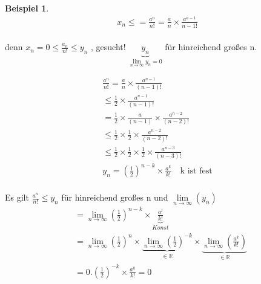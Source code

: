 \documentclass[a4paper,12pt,leqno]{report}
\theoremstyle{plain} %
\theoremstyle{definition} %
\newtheorem{example}[theorem]{Beispiel}
\begin{document}
\begin{example}
\begin{equation}
\begin{aligned}
x_n \leq  = \frac{a^n}{n!} = \frac{a}{n} \times \frac{a^{a-1}}{n-1!} %
\end{aligned}
\end{equation}\\

denn $ x_n = 0 \leq \frac{a_n}{n!} \leq y_n$ 
, gesucht! $\underbrace{y_n}_{\lim\limits_{n \rightarrow \infty}{y_n}=0}$  für hinreichend großes n. 

\begin{equation}
\begin{aligned}
\frac{a^n}{n!} = \frac{a}{n} \times \frac{a^{n-1}}{(n-1)!} \\ \leq 
\frac{1}{2} \times
\frac{a^{n-1}}{(n-1)!} \\ =
 \frac{1}{2} \times 
\frac{a}{(n-1)} \times 
\frac{a^{n-2}}{(n-2)!} \\ \leq
\frac{1}{2} \times 
\frac{1}{2} \times
\frac{a^{n-2}}{(n-2)!} \\ \leq
\frac{1}{2} \times
\frac{1}{2} \times
\frac{1}{2} \times 
\frac{a^{n-3}}{(n-3)!}\\
%
y_n = (\frac{1}{2})^{n-k} \times \frac{a^k}{k!} \quad \text{k ist fest} 
 \end{aligned}
\end{equation}\\

{Es gilt} $\frac{a^n}{n!} \leq y_n$  für hinreichend großes n und 
 $\lim\limits_{n \rightarrow \infty}{(y_n)}$ \\

\begin{equation}
\begin{aligned}
&=
\lim\limits_{n \rightarrow \infty}{(\frac{1}{2})^{n-k}} \times 
\underbrace{\frac{a^l}{k!}}_{Konst} \\
&= 
\lim\limits_{n \rightarrow \infty}{(\frac{1}{2})^{n}} \times
\underbrace{\lim\limits_{n \rightarrow \infty}{(\frac{1}{2})^{-k}}}_{\in \mathbb{R}} \times 
\underbrace{\lim\limits_{n \rightarrow \infty}{(\frac{a^k}{k!})}}_{\in \mathbb{R}} \\
&= 0 . (\frac{1}{2})^{-k} \times \frac{a^k}{k!}=0 
\\
\end{aligned}
\end{equation} 
\end{example}
\end{document}
